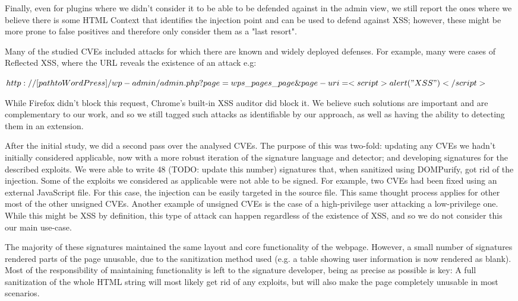  Finally, even for plugins where we didn't consider it to be able to be defended against in the admin view, we still report the ones where we believe there is some HTML Context that identifies the injection point and can be used to defend against \ac{XSS}; however, these might be more prone to false positives and therefore only consider them as a "last resort".

Many of the studied CVEs included attacks for which there are known and widely deployed defenses. For example, many were cases of Reflected \ac{XSS}, where the URL reveals the existence of an attack e.g:


$http://[path to WordPress]/wp-admin/admin.php?page=wps\_pages\_page\&page-uri=<script>alert("XSS")</script>$

While Firefox didn't block this request, Chrome's built-in \ac{XSS} auditor did block it. We believe such solutions are important and are complementary to our work, and so we still tagged such attacks as identifiable by our approach, as well as having the ability to detecting them in an extension.

After the initial study, we did a second pass over the analysed CVEs. The purpose of this was two-fold: updating any CVEs we hadn't initially considered applicable, now with a more robust iteration of the signature language and detector; and developing signatures for the described exploits. We were able to write 48 (TODO: update this number) signatures that, when sanitized using DOMPurify, got rid of the injection. Some of the exploits we considered as applicable were not able to be signed. For example, two CVEs had been fixed using an external JavaScript file. For this case, the injection can be easily targeted in the source file. This same thought process applies for other most of the other unsigned CVEs. Another example of unsigned CVEs is the case of a high-privilege user attacking a low-privilege one. While this might be \ac{XSS} by definition, this type of attack can happen regardless of the existence of \ac{XSS}, and so we do not consider this our main use-case.

The majority of these signatures maintained the same layout and core functionality of the webpage. However, a small number of signatures rendered parts of the page unusable, due to the sanitization method used (e.g. a table showing user information is now rendered as blank). Most of the responsibility of maintaining functionality is left to the signature developer, being as precise as possible is key: A full sanitization of the whole HTML string will most likely get rid of any exploits, but will also make the page completely unusable in most scenarios.

